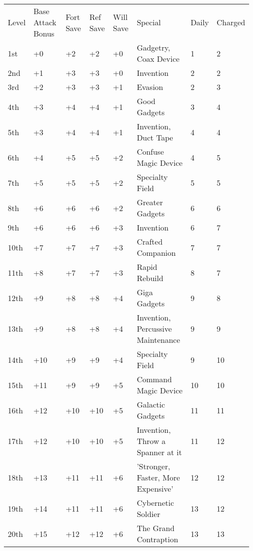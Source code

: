 \vspace{-8pt}







\begin{table}[htb]
\begin{small}
\begin{tabular}[h]{lp{1.9cm}p{0.7cm}p{0.7cm}p{0.7cm}p{7cm}ll}
Level&Base Attack Bonus&Fort Save&Ref Save&Will Save&Special&Daily&Charged\\
1st&  +0  & +2&  +2&  +0&Gadgetry, Coax Device  & 1& 2 \\
2nd&  +1  & +3&  +3&  +0&Invention  & 2& 2 \\
3rd&  +2  & +3&  +3&  +1&Evasion  & 2& 3 \\
4th&  +3  & +4&  +4&  +1&Good Gadgets  & 3& 4 \\
5th&  +3  & +4&  +4&  +1&Invention, Duct Tape  & 4& 4 \\
6th&  +4  & +5&  +5&  +2&Confuse Magic Device  & 4& 5 \\
7th&  +5  & +5&  +5&  +2&Specialty Field  & 5& 5 \\
8th&  +6  & +6&  +6&  +2&Greater Gadgets  & 6& 6 \\
9th&  +6  & +6&  +6&  +3&Invention  & 6& 7 \\
10th& +7  & +7&  +7&  +3&Crafted Companion  & 7& 7 \\
11th& +8  & +7&  +7&  +3&Rapid Rebuild  & 8& 7 \\
12th& +9  & +8&  +8&  +4&Giga Gadgets  & 9& 8 \\
13th& +9  & +8&  +8&  +4&Invention, Percussive Maintenance  & 9& 9 \\
14th& +10 & +9&  +9&  +4&Specialty Field  & 9& 10\\
15th& +11 & +9&  +9&  +5&Command Magic Device  & 10&10\\
16th& +12 & +10& +10& +5&Galactic Gadgets  & 11&11\\
17th& +12 & +10& +10& +5&Invention, Throw a Spanner at it  & 11&12\\
18th& +13 & +11& +11& +6&'Stronger, Faster, More Expensive'  & 12&12\\
19th& +14 & +11& +11& +6&Cybernetic Soldier  & 13&12\\
20th& +15 & +12& +12& +6&The Grand Contraption  & 13&13\\
\end{tabular}
\end{small}
\end{table}

